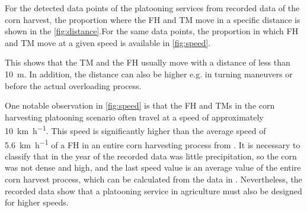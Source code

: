 \documentclass[]{nsm-thesis}
\begin{document}
For the detected data points of the platooning services from recorded data of the corn harvest, the proportion where the \ac{FH} and \ac{TM} move in a specific distance is shown in the \autoref{fig:distance}.For the same data points, the proportion in which \ac{FH} and \ac{TM} move at a given speed is available in \autoref{fig:speed}.

This shows that the \ac{TM} and the \ac{FH} usually move with a distance of less than \SI{10}{\metre}. In addition, the distance can also be higher e.g. in turning maneuvers or before the actual overloading process.

One notable observation in \autoref{fig:speed} is that the \ac{FH} and \ac{TM}s in the corn harvesting platooning scenario often travel at a speed of approximately \SI{10}{\kilo\metre\per\hour}. This speed is significantly higher than the average speed of \SI{5.6}{\kilo\metre\per\hour} of a \ac{FH} in an entire corn harvesting process from \cite{faustzahlen2018}. It is necessary to classify that in the year of the recorded data was little precipitation, so the corn was not dense and high, and the last speed value is an average value of the entire corn harvest process, which can be calculated from the data in \cite{faustzahlen2018}.
Nevertheless, the recorded data show that a platooning service in agriculture must also be designed for higher speeds. 
\end{document}
